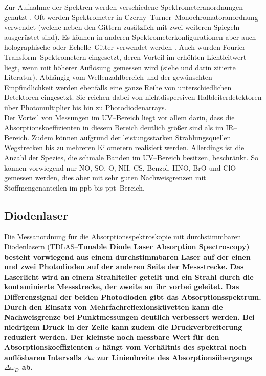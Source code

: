Zur Aufnahme der Spektren werden verschiedene
Spektrometeranordnungen genutzt \cite{platt94}. Oft werden
Spektrometer in
Czer\-ny--\-Tur\-ner--\-Mo\-no\-chro\-ma\-tor\-an\-ordn\-ung
verwendet (welche neben den Gittern zusätzlich mit zwei weiteren
Spiegeln ausgerüstet sind). Es können in anderen
Spektrometerkonfigurationen aber auch holographische oder
Echelle--Gitter verwendet werden \cite{becker-ross97}. Auch wurden
Fourier--Transform--Spektrometern eingesetzt, deren Vorteil im
erhöhten Lichtleitwert liegt, wenn mit höherer Auflösung gemessen
wird (siehe \cite{platt94} und darin zitierte Literatur). Abhängig
vom Wellenzahlbereich und der gewünschten Empfindlichkeit werden
ebenfalls eine ganze Reihe von unterschiedlichen Detektoren
eingesetzt. Sie reichen dabei von nichtdispersiven
Halbleiterdetektoren über Photomultiplier bis hin zu
Photodiodenarrays.\\

Der Vorteil von Messungen im UV--Bereich liegt vor allem darin,
dass die Absorptionskoeffizienten in diesem Bereich deutlich
grö{\ss}er sind als im IR--Bereich. Zudem können aufgrund der
leistungsstarken Strahlungsquellen Wegstrecken bis zu mehreren
Kilometern realisiert werden. Allerdings ist die Anzahl der
Spezies, die schmale Banden im UV--Bereich besitzen, beschränkt.
So können vorwiegend nur NO, SO, O,
NH, CS, Benzol, HNO, BrO und ClO gemessen
werden, dies aber mit sehr guten Nachweisgrenzen mit
Stoffmengenanteilen im ppb bis ppt--Bereich.


\subsection{\label{diodenlaser}Diodenlaser}

Die Messanordnung für die Absorptionsspektroskopie mit
durchstimmbaren Diodenlasern (TDLAS--\bf T\rm unable \bf D\rm iode
\bf L\rm aser \bf A\rm bsorption \bf S\rm pectroscopy) besteht
vorwiegend aus einem durchstimmbaren Laser auf der einen und zwei
Photodioden auf der anderen Seite der Messstrecke. Das Laserlicht
wird an einem Strahlteiler geteilt und ein Strahl durch die
kontaminierte Messstrecke, der zweite an ihr vorbei geleitet. Das
Differenzsignal der beiden Photodioden gibt das
Absorptionsspektrum. Durch den Einsatz von
Mehrfachreflexionsküvetten kann die Nachweisgrenze bei
Punktmessungen deutlich verbessert werden. Bei niedrigem Druck in
der Zelle kann zudem die Druckverbreiterung reduziert werden. Der
kleinste noch messbare Wert für den Absorptionskoeffizienten
$\alpha$ hängt vom Verhältnis des spektral noch auflösbaren
Intervalls $\Delta\omega$ zur Linienbreite des
Absorptionsübergangs $\Delta\omega_D$ ab.\\

